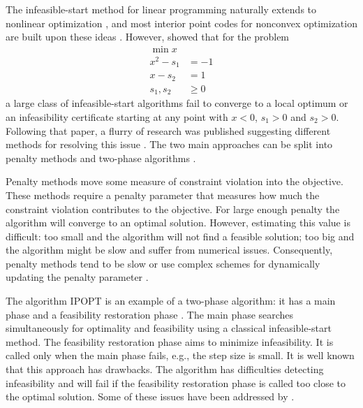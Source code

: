 \documentclass{article}
\begin{document}
The infeasible-start method for linear programming \cite{lustig1990feasibility} naturally extends to nonlinear optimization \cite{kortanek1997infeasible},
and most interior point codes for nonconvex optimization are built upon these ideas \cite{byrd2006knitro,vanderbei1999loqo,wachter2006implementation}. However, \citet*{wachter2000failure} showed that for the problem
\begin{subequations}\label{failure-ex}
\begin{flalign}
\min { x }\\
x^2 - s_{1} &= -1 \\
x - s_{2} &= 1 \\
s_1, s_2 &\ge 0
\end{flalign}
\end{subequations}
a large class of infeasible-start algorithms fail to converge to a local optimum or an infeasibility certificate starting at any point with $x < 0$, $s_{1} > 0$ and $s_{2} > 0$. Following that paper, a flurry of research was published suggesting different methods for resolving this issue \cite{benson2004interior,chen2006interior,curtis2012penalty,gould2015interior,liu2004robust,wachter2006implementation}. The two main approaches can be split into penalty methods \cite{chen2006interior,curtis2012penalty,gould2015interior,liu2004robust} and two-phase algorithms \cite{wachter2006implementation}. 

Penalty methods move some measure of constraint violation into the objective. These methods require a penalty parameter that measures how much the constraint violation contributes to the objective. For large enough penalty the algorithm will converge to an optimal solution. However, estimating this value is difficult: too small and the algorithm will not find a feasible solution; too big and the algorithm might be slow and suffer from numerical issues. Consequently, penalty methods tend to be slow \cite[Algorithm 1]{curtis2012penalty} or use complex schemes for dynamically updating the penalty parameter \cite[Algorithm 2]{curtis2012penalty}. 

The algorithm IPOPT is an example of a two-phase algorithm: it has a main phase and a feasibility restoration phase  \cite{wachter2006implementation}. The main phase searches simultaneously for optimality and feasibility using a classical infeasible-start method. The feasibility restoration phase aims to minimize infeasibility. It is called only when the main phase fails, e.g., the step size is small. It is well known that this approach has drawbacks. The algorithm has difficulties detecting infeasibility \cite[Table 15]{huang2016solution} and will fail if the feasibility restoration phase is called too close to the optimal solution. Some of these issues have been addressed by \citet*{nocedal2014interior}. 
\end{document}
